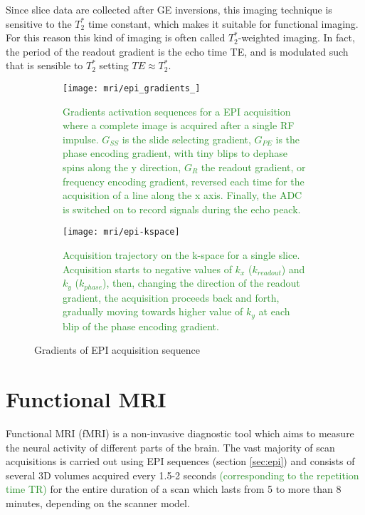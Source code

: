 \documentclass[11pt]{report}
\begin{document}
Since slice data are collected after GE inversions, this imaging technique is sensitive to the $T_2^*$ time constant, which makes it suitable for functional imaging. 
For this reason this kind of imaging is often called $T_2^*$-weighted imaging.
In fact, the period of the readout gradient is the echo time TE, and is modulated such that is sensible to $T_2^{\ast}$ setting $TE \approx T_2^{\ast}$.



\begin{figure}
\begin{subfigure}{0.7\textwidth}
\texttt{[image: mri/epi\_gradients\_]}
\caption{\textcolor{ForestGreen}{Gradients activation sequences for a EPI acquisition where a complete image is acquired after a single RF impulse. $G_{SS}$ is the slide selecting gradient, $G_{PE}$ is the phase encoding gradient, with tiny blips to dephase spins along the y direction, $G_{R}$ the readout gradient, or frequency encoding gradient, reversed each time for the acquisition of a line along the x axis. Finally, the ADC is switched on to record signals during the echo peack.}
}
\label{fig:epi_gradients}
\end{subfigure}
\begin{subfigure}{0.5\textwidth}
\texttt{[image: mri/epi-kspace]}
\caption{\textcolor{ForestGreen}{Acquisition trajectory on the k-space for a single slice. Acquisition starts to negative values of $k_x$ ($k_{readout}$) and $k_y$ ($k_{phase}$), then, changing the direction of the readout gradient, the acquisition proceeds back and forth, gradually moving towards higher value of $k_y$ at each blip of the phase encoding gradient.}}
\label{fig:epi_kspace}
\end{subfigure}
\caption{Gradients of EPI acquisition sequence}
\label{fig:epi}
\end{figure}



\section{Functional MRI}\label{sec:fmri}

Functional MRI (fMRI) is a non-invasive diagnostic tool which aims to measure the neural activity of different parts of the brain.
The vast majority of scan acquisitions is carried out using EPI sequences (section \ref{sec:epi}) and consists of several 3D volumes acquired every 1.5-2 seconds \textcolor{ForestGreen}{(corresponding to the repetition time TR)} for the entire duration of a scan which lasts from 5 to more than 8 minutes, depending on the scanner model.
\end{document}
